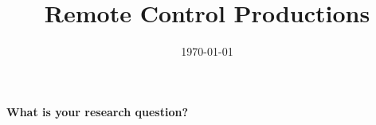 \documentclass[11pt]{article}
\title{Remote Control Productions
}
\date{\today}
\begin{document}
\maketitle
{\bfseries\large What is your research question?}\\
\end{document}
